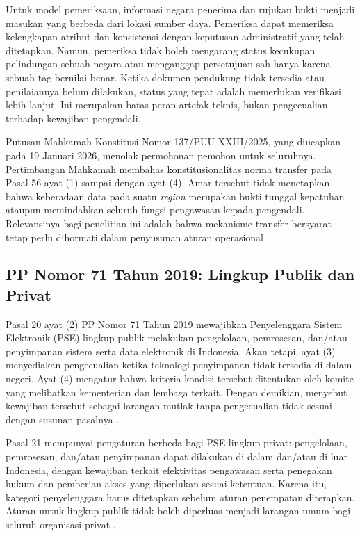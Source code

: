 Untuk model pemeriksaan, informasi negara penerima dan rujukan bukti menjadi masukan yang berbeda dari lokasi sumber daya. Pemeriksa dapat memeriksa kelengkapan atribut dan konsistensi dengan keputusan administratif yang telah ditetapkan. Namun, pemeriksa tidak boleh mengarang status kecukupan pelindungan sebuah negara atau menganggap persetujuan sah hanya karena sebuah tag bernilai benar. Ketika dokumen pendukung tidak tersedia atau penilaiannya belum dilakukan, status yang tepat adalah memerlukan verifikasi lebih lanjut. Ini merupakan batas peran artefak teknis, bukan pengecualian terhadap kewajiban pengendali.

Putusan Mahkamah Konstitusi Nomor 137/PUU-XXIII/2025, yang diucapkan pada 19 Januari 2026, menolak permohonan pemohon untuk seluruhnya. Pertimbangan Mahkamah membahas konstitusionalitas norma transfer pada Pasal 56 ayat (1) sampai dengan ayat (4). Amar tersebut tidak menetapkan bahwa keberadaan data pada suatu \textit{region} merupakan bukti tunggal kepatuhan ataupun memindahkan seluruh fungsi pengawasan kepada pengendali. Relevansinya bagi penelitian ini adalah bahwa mekanisme transfer bersyarat tetap perlu dihormati dalam penyusunan aturan operasional \autocite[hlm. 220--222]{mk2026}.

\subsection{PP Nomor 71 Tahun 2019: Lingkup Publik dan Privat}
Pasal 20 ayat (2) PP Nomor 71 Tahun 2019 mewajibkan Penyelenggara Sistem Elektronik (PSE) lingkup publik melakukan pengelolaan, pemrosesan, dan/atau penyimpanan sistem serta data elektronik di Indonesia. Akan tetapi, ayat (3) menyediakan pengecualian ketika teknologi penyimpanan tidak tersedia di dalam negeri. Ayat (4) mengatur bahwa kriteria kondisi tersebut ditentukan oleh komite yang melibatkan kementerian dan lembaga terkait. Dengan demikian, menyebut kewajiban tersebut sebagai larangan mutlak tanpa pengecualian tidak sesuai dengan susunan pasalnya \autocite[Pasal 20]{pp712019}.

Pasal 21 mempunyai pengaturan berbeda bagi PSE lingkup privat: pengelolaan, pemrosesan, dan/atau penyimpanan dapat dilakukan di dalam dan/atau di luar Indonesia, dengan kewajiban terkait efektivitas pengawasan serta penegakan hukum dan pemberian akses yang diperlukan sesuai ketentuan. Karena itu, kategori penyelenggara harus ditetapkan sebelum aturan penempatan diterapkan. Aturan untuk lingkup publik tidak boleh diperluas menjadi larangan umum bagi seluruh organisasi privat \autocite[Pasal 21]{pp712019}.

